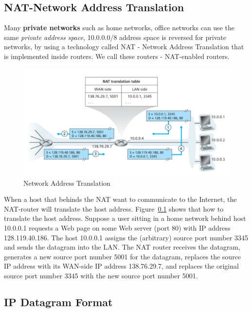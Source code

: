 \documentclass[a4paper, 11pt]{article}
\begin{document}
\subsection{NAT-Network Address Translation} \label{NAT}

Many \textbf{private networks} such as  home networks, office networks can use the same \textit{private address space}, 10.0.0.0/8 address space is reversed for private networks, by using a technology called NAT - Network Address Translation that is implemented inside routers. We call these routers - NAT-enabled routers.\\

\begin{figure}[h]
\includegraphics[scale=0.6]{nat.png}
\caption{Network Address Translation}
\label{fig:nat}
\end{figure}

When a host that behinds the NAT want to communicate to the Internet, the NAT-router will translate the host address. Figure~\ref{NAT} shows that how to translate the host address. Suppose a user sitting in a home network behind host 10.0.0.1 requests a Web page on some Web server (port 80) with IP address 128.119.40.186. The host 10.0.0.1 assigns the (arbitrary) source port number 3345 and sends the datagram into the LAN. The NAT router receives the datagram, generates a new source port number 5001 for the datagram, replaces the source IP address with its WAN-side IP address 138.76.29.7, and replaces the original source port number 3345 with the new source port number 5001.

\subsection{IP Datagram Format}
\end{document}
